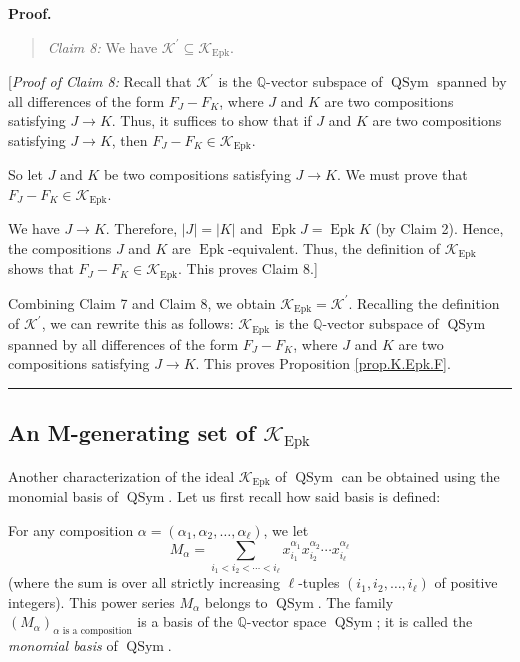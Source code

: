 \documentclass[numbers=enddot,12pt,final,onecolumn,notitlepage]{scrartcl}%
\theoremstyle{definition}
\newenvironment{statement}{\begin{quote}}{\end{quote}}
\newenvironment{proof}[1][Proof]{\noindent\textbf{#1.} }{\ \rule{0.5em}{0.5em}}
\newenvironment{verlong}{}{}
\let\sumnonlimits\sum
\renewcommand{\sum}{\sumnonlimits\limits}
\begin{document}
\begin{verlong}
\begin{proof}
\begin{statement}
\textit{Claim 8:} We have $\mathcal{K}^{\prime}\subseteq\mathcal{K}%
_{\operatorname{Epk}}$.
\end{statement}

[\textit{Proof of Claim 8:} Recall that $\mathcal{K}^{\prime}$ is the
$\mathbb{Q}$-vector subspace of $\operatorname*{QSym}$ spanned by all
differences of the form $F_{J}-F_{K}$, where $J$ and $K$ are two compositions
satisfying $J\rightarrow K$. Thus, it suffices to show that if $J$ and $K$ are
two compositions satisfying $J\rightarrow K$, then $F_{J}-F_{K}\in
\mathcal{K}_{\operatorname{Epk}}$.

So let $J$ and $K$ be two compositions satisfying $J\rightarrow K$. We must
prove that $F_{J}-F_{K}\in\mathcal{K}_{\operatorname{Epk}}$.

We have $J\rightarrow K$. Therefore, $\left|J\right| = \left|K\right|$ and
$\operatorname{Epk} J = \operatorname{Epk} K$ (by Claim 2).
Hence, the compositions $J$ and $K$ are $\operatorname{Epk}$-equivalent.
Thus, the definition of $\mathcal{K}_{\operatorname{Epk}}$ shows that
$F_{J}-F_{K} \in \mathcal{K}_{\operatorname{Epk}}$.
This proves Claim 8.]

Combining Claim 7 and Claim 8, we obtain $\mathcal{K}_{\operatorname{Epk}}
=\mathcal{K}^{\prime}$. Recalling the definition of $\mathcal{K}^{\prime}$,
we can rewrite this as follows: $\mathcal{K}_{\operatorname{Epk}}$ is the
$\mathbb{Q}$-vector subspace of $\operatorname*{QSym}$ spanned by all
differences of the form $F_{J}-F_{K}$, where $J$ and $K$ are two compositions
satisfying $J\rightarrow K$. This proves Proposition \ref{prop.K.Epk.F}.
\end{proof}
\end{verlong}

\subsection{An M-generating set of $\mathcal{K}_{\operatorname{Epk}}$}

Another characterization of the ideal $\mathcal{K}_{\operatorname{Epk}}$ of
$\operatorname*{QSym}$ can be obtained using the monomial basis of
$\operatorname*{QSym}$. Let us first recall how said basis is defined:

For any composition $\alpha=\left(  \alpha_{1},\alpha_{2},\ldots,\alpha_{\ell
}\right)  $, we let%
\[
M_{\alpha}=\sum_{i_{1}<i_{2}<\cdots<i_{\ell}}x_{i_{1}}^{\alpha_{1}}x_{i_{2}%
}^{\alpha_{2}}\cdots x_{i_{\ell}}^{\alpha_{\ell}}%
\]
(where the sum is over all strictly increasing $\ell$-tuples $\left(
i_{1},i_{2},\ldots,i_{\ell}\right)  $ of positive integers). This power series
$M_{\alpha}$ belongs to $\operatorname*{QSym}$. The family $\left(  M_{\alpha
}\right)  _{\alpha\text{ is a composition}}$ is a basis of the $\mathbb{Q}%
$-vector space $\operatorname*{QSym}$; it is called the \textit{monomial
basis} of $\operatorname*{QSym}$.
\end{document}
